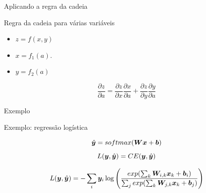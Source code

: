 \documentclass[10pt]{beamer}
\begin{document}
\begin{frame}{Aplicando a regra da cadeia}

\end{frame}

\begin{frame}{Regra da cadeia para várias variáveis}
\Large{
\begin{itemize}
\item $z = f(x,y)$
\item $x = f_{1}(a)$. 
\item $y = f_{2}(a)$
\end{itemize}
\[
\frac{\partial z}{ \partial a} = \frac{\partial z}{\partial x} \frac{\partial x}{\partial a} + \frac{\partial z}{\partial y} \frac{\partial y}{\partial a} 
\]
}
\end{frame}


\begin{frame}{Exemplo}

\end{frame}

\begin{frame}{Exemplo: regressão logística}
\Large{
\begin{equation*}
\hat{\bm{y}} = softmax(\bm{W}\bm{x} + \bm{b})
\end{equation*}
\begin{equation*}
L(\bm{y},\hat{\bm{y}}) = CE(\bm{y},\hat{\bm{y}})
\end{equation*}


\begin{equation*}
L(\bm{y},\hat{\bm{y}}) = - \sum_{i}\bm{y}_{i} \log \left(\frac{exp(\sum_{k} \bm{W}_{i,k}\bm{x}_{k} + \bm{b}_{i})}{\sum_{j}exp(\sum_{k}\bm{W}_{j,k}\bm{x}_{k} + \bm{b}_{j})} \right)
\end{equation*}
}
\end{frame}
\end{document}
